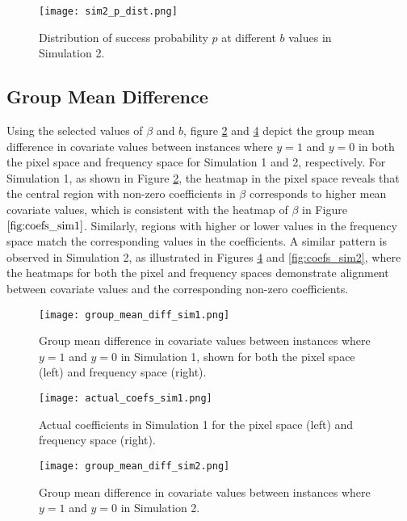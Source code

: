 \documentclass[12pt]{article}
\begin{document}
\begin{figure}[h!]
	\centering
	\texttt{[image: sim2\_p\_dist.png]}
	\caption{Distribution of success probability \( p \) at different \( b \) values in Simulation 2.}
	\label{fig:sim2_p_dist}
\end{figure}

\FloatBarrier

\subsection*{Group Mean Difference}

Using the selected values of \( \beta \) and \( b \), figure \ref{fig:group_diff1} and \ref{fig:group_diff2} depict the group mean difference in covariate values between instances where \( y = 1 \) and \( y = 0 \) in both the pixel space and frequency space for Simulation 1 and 2, respectively. For Simulation 1, as shown in Figure \ref{fig:group_diff1}, the heatmap in the pixel space reveals that the central region with non-zero coefficients in \( \beta \) corresponds to higher mean covariate values, which is consistent with the heatmap of \( \beta \) in Figure \( \ref{fig:coefs_sim1} \). Similarly, regions with higher or lower values in the frequency space match the corresponding values in the coefficients. A similar pattern is observed in Simulation 2, as illustrated in Figures \ref{fig:group_diff2} and \ref{fig:coefs_sim2}, where the heatmaps for both the pixel and frequency spaces demonstrate alignment between covariate values and the corresponding non-zero coefficients.

\begin{figure}[h!]
	\centering
	\texttt{[image: group\_mean\_diff\_sim1.png]}
	\caption{Group mean difference in covariate values between instances where \( y = 1 \) and \( y = 0 \) in Simulation
		1, shown for both the pixel space (left) and frequency space (right).}
	\label{fig:group_diff1}
\end{figure}

\begin{figure}[h!]
	\centering
	\texttt{[image: actual\_coefs\_sim1.png]}
	\caption{Actual coefficients in Simulation 1 for the pixel space (left) and frequency space (right).}
	\label{fig:coefs_sim1}
\end{figure}

\begin{figure}[h!]
	\centering
	\texttt{[image: group\_mean\_diff\_sim2.png]}
	\caption{Group mean difference in covariate values between instances where \( y = 1 \) and \( y = 0 \) in Simulation 2.}
	\label{fig:group_diff2}
\end{figure}
\end{document}
